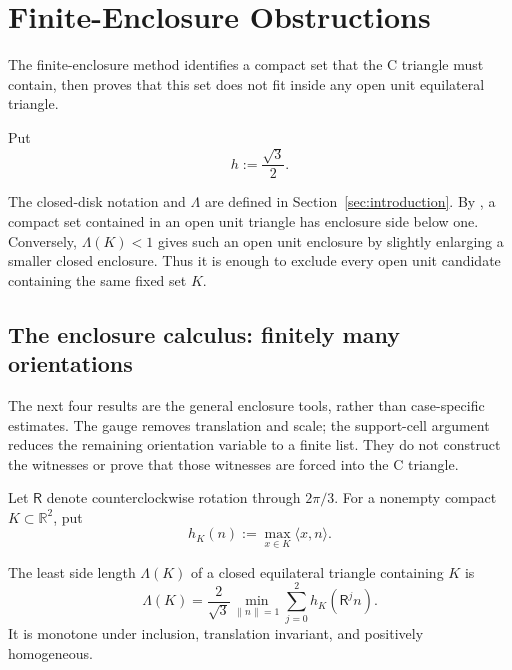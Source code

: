 \section[Finite-Enclosure Method]{Finite-Enclosure Obstructions}
\label{sec:finite-enclosure}

The finite-enclosure method identifies a compact set that the C triangle
must contain, then proves that this set does not fit inside any open unit
equilateral triangle.

Put
\[
 h:=\frac{\sqrt3}{2}.
\]

The closed-disk notation and $\Lambda$ are defined in
Section~\ref{sec:introduction}. By , a
compact set contained in an open unit triangle has enclosure side below
one. Conversely, $\Lambda(K)<1$ gives such an open unit enclosure by
slightly enlarging a smaller closed enclosure. Thus it is enough to
exclude every open unit candidate containing the same fixed set $K$.



\subsection{The enclosure calculus: finitely many orientations}
\label{sec:universal-calculus}

The next four results are the general enclosure tools, rather than
case-specific estimates. The gauge removes translation and scale; the
support-cell argument reduces the remaining orientation variable to a
finite list. They do not construct the witnesses or prove that those
witnesses are forced into the C triangle.



Let $\mathsf R$ denote counterclockwise rotation through $2\pi/3$.  For a
nonempty compact $K\subset\mathbb R^2$, put
\[
 h_K(n):=\max_{x\in K}\langle x,n\rangle.
\]

\begin{proposition}
\label{prop:new-enclosure-gauge}
\label{prop:universal-enclosure-gauge}
The least side length $\Lambda(K)$ of a closed equilateral triangle containing
$K$ is
\begin{equation}
 \Lambda(K)=\frac2{\sqrt3}
 \min_{\lVert n\rVert=1}\sum_{j=0}^2h_K(\mathsf R^jn).
 \label{eq:universal-lambda}
\end{equation}
It is monotone under inclusion, translation invariant, and positively
homogeneous.
\end{proposition}

